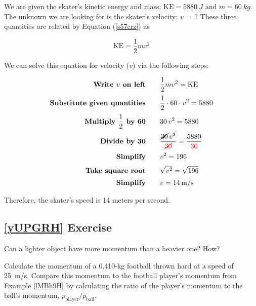 \documentclass[main.tex]{subfiles}
\begin{document}
\Solution We are given the skater's kinetic energy and mass: $\mathrm{KE} = \SI{5880}{J}$ and $m = \SI{60}{kg}$. The unknown we are looking for is the skater's velocity: $v =\ ?$ These three quantities are related by Equation (\ref{s57crz}) as

\begin{equation*}
    \mathrm{KE} = \frac{1}{2} m v^2
\end{equation*}

We can solve this equation for velocity ($v$) via the following steps:

\begin{align*}
    \textbf{Write $v$ on left} \qquad & \frac{1}{2} m v^2 = \mathrm{KE}\\[0.5ex]
    \textbf{Substitute given quantities} \qquad & \frac{1}{2} \cdot 60 \cdot v^2 = 5880\\[0.5ex]
    \textbf{Multiply $\frac{1}{2}$ by 60} \qquad & 30\,v^2 = 5880\\[0.5ex]
    \textbf{Divide by 30} \qquad & \frac{\cancel{30}\,v^2}{\textcolor{red}{\cancel{30}}} = \frac{5880}{\textcolor{red}{30}}\\[0.5ex]
    \textbf{Simplify} \qquad & v^2 = 196\\[0.5ex]
    \textbf{Take square root} \qquad & \sqrt{v^2} = \sqrt{196}\\[0.5ex]
    \textbf{Simplify} \qquad & v = \SI{14}{m/s}\\
\end{align*}

Therefore, the skater's speed is 14 meters per second.

\solutionEnd

\subsection*{\ref{yUPGRH} Exercise}

\begin{exercise}
    Can a lighter object have more momentum than a heavier one? How?
\end{exercise}


\begin{exercise} \label{QDJrfn}
    Calculate the momentum of a 0.410-kg football thrown hard at a speed of \SI{25}{m/s}. Compare this momentum to the football player's momentum from Example \ref{lMBh9H} by calculating the ratio of the player's momentum to the ball's momentum, $p_{\text{player}}/p_{\text{ball}}$.
\end{exercise}
\end{document}
